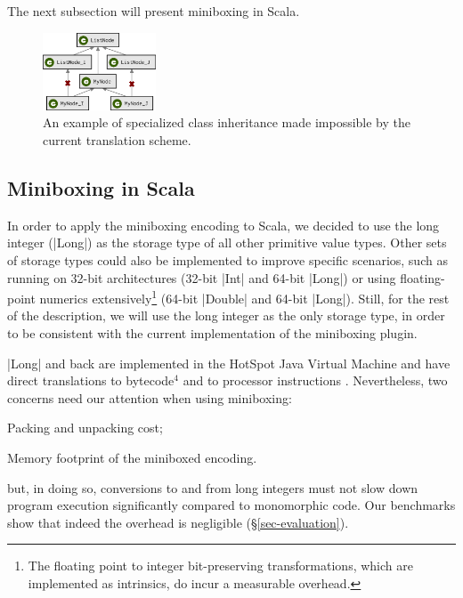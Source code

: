 The next subsection will present miniboxing in Scala.

\begin{figure}[t]
    \centering
    \includegraphics[width=0.30\textwidth]{diags/spec-multi.eps}
    \caption{An example of specialized class inheritance made impossible by the current translation scheme.}
    \label{fig-spec-multi}
    \vspace{-3mm}
\end{figure}

\subsection{Miniboxing in Scala}

In order to apply the miniboxing encoding to Scala, we decided to use the long integer (|Long|) as the storage type of all other primitive value types. Other sets of storage types could also be implemented to improve specific scenarios, such as running on 32-bit architectures (32-bit |Int| and 64-bit |Long|) or using floating-point numerics extensively\footnote{The floating point to integer bit-preserving transformations, which are implemented as intrinsics, do incur a measurable overhead.} (64-bit |Double| and 64-bit |Long|). Still, for the rest of the description, we will use the long integer as the only storage type, in order to be consistent with the current implementation of the miniboxing plugin.

 |Long| and back are implemented in the HotSpot Java Virtual Machine and have direct translations to bytecode$^\text{4}$ and to processor instructions \cite{intel-ia-32-instruction-reference}. Nevertheless, two concerns need our attention when using miniboxing: %
\begin{packed_item}
\item Packing and unpacking cost;
\item Memory footprint of the miniboxed encoding.
\end{packed_item}

 but, in doing so, conversions to and from long integers must not slow down program execution significantly compared to monomorphic code. Our benchmarks show that indeed the overhead is negligible (\S{}\ref{sec-evaluation}).

